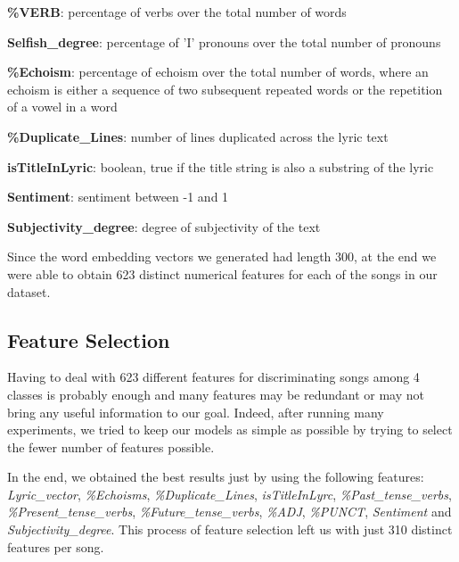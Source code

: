 \begin{description}
\item \textbf{\%VERB}: percentage of verbs over the total number of words
\item \textbf{Selfish\_degree}: percentage of 'I' pronouns over the total number of pronouns
\item \textbf{\%Echoism}: percentage of echoism over the total number of words, where an echoism is either a sequence of two subsequent repeated words or the repetition of a vowel in a word
\item \textbf{\%Duplicate\_Lines}: number of lines duplicated across the lyric text
\item \textbf{isTitleInLyric}: boolean, true if the title string is also a substring of the lyric
\item \textbf{Sentiment}: sentiment between -1 and 1
\item \textbf{Subjectivity\_degree}: degree of subjectivity of the text
\end{description}

Since the word embedding vectors we generated had length 300, at the end we were able to obtain 623 distinct numerical features for each of the songs in our dataset.

\subsection{Feature Selection}

Having to deal with 623 different features for discriminating songs among 4 classes is probably enough and many features may be redundant or may not bring any useful information to our goal. Indeed, after running many experiments, we tried to keep our models as simple as possible by trying to select the fewer number of features possible.

In the end, we obtained the best results just by using the following features: \textit{Lyric\_vector}, \textit{\%Echoisms}, \textit{\%Duplicate\_Lines}, \textit{isTitleInLyrc}, \textit{\%Past\_tense\_verbs}, \textit{\%Present\_tense\_verbs}, \textit{\%Future\_tense\_verbs}, \textit{\%ADJ}, \textit{\%PUNCT}, \textit{Sentiment} and \textit{Subjectivity\_degree}. This process of feature selection left us with just 310 distinct features per song.


